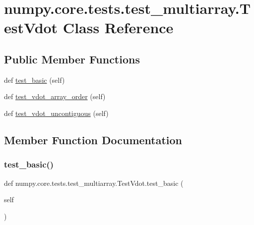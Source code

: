 \hypertarget{classnumpy_1_1core_1_1tests_1_1test__multiarray_1_1TestVdot}{}\section{numpy.\+core.\+tests.\+test\+\_\+multiarray.\+Test\+Vdot Class Reference}
\label{classnumpy_1_1core_1_1tests_1_1test__multiarray_1_1TestVdot}
\subsection*{Public Member Functions}
\begin{DoxyCompactItemize}
\item 
def \hyperlink{classnumpy_1_1core_1_1tests_1_1test__multiarray_1_1TestVdot_a979a39bfb54444f6860298393a365005}{test\+\_\+basic} (self)
\item 
def \hyperlink{classnumpy_1_1core_1_1tests_1_1test__multiarray_1_1TestVdot_a41d8deebb81142bb9423a43a79ec3054}{test\+\_\+vdot\+\_\+array\+\_\+order} (self)
\item 
def \hyperlink{classnumpy_1_1core_1_1tests_1_1test__multiarray_1_1TestVdot_a6f936887d8ba99ac383e57c02aa74bcf}{test\+\_\+vdot\+\_\+uncontiguous} (self)
\end{DoxyCompactItemize}


\subsection{Member Function Documentation}
\mbox{\label{classnumpy_1_1core_1_1tests_1_1test__multiarray_1_1TestVdot_a979a39bfb54444f6860298393a365005}} 
\subsubsection{\texorpdfstring{test\+\_\+basic()}{test\_basic()}}
{\footnotesize\ttfamily def numpy.\+core.\+tests.\+test\+\_\+multiarray.\+Test\+Vdot.\+test\+\_\+basic (\begin{DoxyParamCaption}\item[{}]{self }\end{DoxyParamCaption})}

